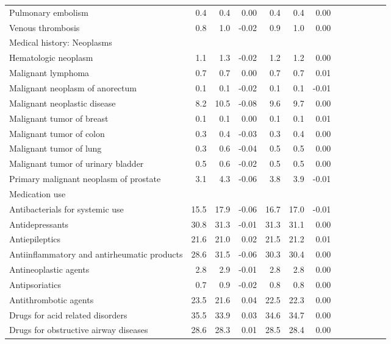 \documentclass[11pt,]{article}
\begin{document}
\begin{longtable}{lrrrrrrrrrrrr}
      Pulmonary embolism &  0.4 &  0.4 &  0.00 &  0.4 &  0.4 &  0.00 \\ 
      Venous thrombosis &  0.8 &  1.0 & -0.02 &  0.9 &  1.0 &  0.00 \\ 
  Medical history: Neoplasms &    &    &     &    &    &     \\ 
      Hematologic neoplasm &  1.1 &  1.3 & -0.02 &  1.2 &  1.2 &  0.00 \\ 
      Malignant lymphoma &  0.7 &  0.7 &  0.00 &  0.7 &  0.7 &  0.01 \\ 
      Malignant neoplasm of anorectum &  0.1 &  0.1 & -0.02 &  0.1 &  0.1 & -0.01 \\ 
      Malignant neoplastic disease &  8.2 & 10.5 & -0.08 &  9.6 &  9.7 &  0.00 \\ 
      Malignant tumor of breast &  0.1 &  0.1 &  0.00 &  0.1 &  0.1 &  0.01 \\ 
      Malignant tumor of colon &  0.3 &  0.4 & -0.03 &  0.3 &  0.4 &  0.00 \\ 
      Malignant tumor of lung &  0.3 &  0.6 & -0.04 &  0.5 &  0.5 &  0.00 \\ 
      Malignant tumor of urinary bladder &  0.5 &  0.6 & -0.02 &  0.5 &  0.5 &  0.00 \\ 
      Primary malignant neoplasm of prostate &  3.1 &  4.3 & -0.06 &  3.8 &  3.9 & -0.01 \\ 
  Medication use &    &    &     &    &    &     \\ 
      Antibacterials for systemic use & 15.5 & 17.9 & -0.06 & 16.7 & 17.0 & -0.01 \\ 
      Antidepressants & 30.8 & 31.3 & -0.01 & 31.3 & 31.1 &  0.00 \\ 
      Antiepileptics & 21.6 & 21.0 &  0.02 & 21.5 & 21.2 &  0.01 \\ 
      Antiinflammatory and antirheumatic products & 28.6 & 31.5 & -0.06 & 30.3 & 30.4 &  0.00 \\ 
      Antineoplastic agents &  2.8 &  2.9 & -0.01 &  2.8 &  2.8 &  0.00 \\ 
      Antipsoriatics &  0.7 &  0.9 & -0.02 &  0.8 &  0.8 &  0.00 \\ 
      Antithrombotic agents & 23.5 & 21.6 &  0.04 & 22.5 & 22.3 &  0.00 \\ 
      Drugs for acid related disorders & 35.5 & 33.9 &  0.03 & 34.6 & 34.7 &  0.00 \\ 
      Drugs for obstructive airway diseases & 28.6 & 28.3 &  0.01 & 28.5 & 28.4 &  0.00 \\ 

\end{longtable}
\end{document}
